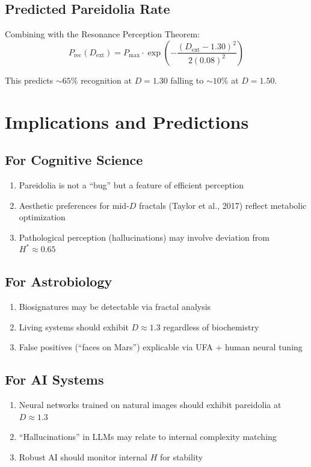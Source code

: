 \documentclass[11pt,a4paper]{article}
\begin{document}
\subsection{Predicted Pareidolia Rate}

Combining with the Resonance Perception Theorem:
\begin{equation}
P_{\text{rec}}(D_{\text{ext}}) = P_{\max} \cdot \exp\left(-\frac{(D_{\text{ext}} - 1.30)^2}{2(0.08)^2}\right)
\end{equation}

This predicts $\sim 65\%$ recognition at $D = 1.30$ falling to $\sim 10\%$ at $D = 1.50$.

\section{Implications and Predictions}

\subsection{For Cognitive Science}
\begin{enumerate}
    \item Pareidolia is not a ``bug'' but a feature of efficient perception
    \item Aesthetic preferences for mid-$D$ fractals (Taylor et al., 2017) reflect metabolic optimization
    \item Pathological perception (hallucinations) may involve deviation from $H^* \approx 0.65$
\end{enumerate}

\subsection{For Astrobiology}
\begin{enumerate}
    \item Biosignatures may be detectable via fractal analysis
    \item Living systems should exhibit $D \approx 1.3$ regardless of biochemistry
    \item False positives (``faces on Mars'') explicable via UFA + human neural tuning
\end{enumerate}

\subsection{For AI Systems}
\begin{enumerate}
    \item Neural networks trained on natural images should exhibit pareidolia at $D \approx 1.3$
    \item ``Hallucinations'' in LLMs may relate to internal complexity matching
    \item Robust AI should monitor internal $H$ for stability
\end{enumerate}
\end{document}
